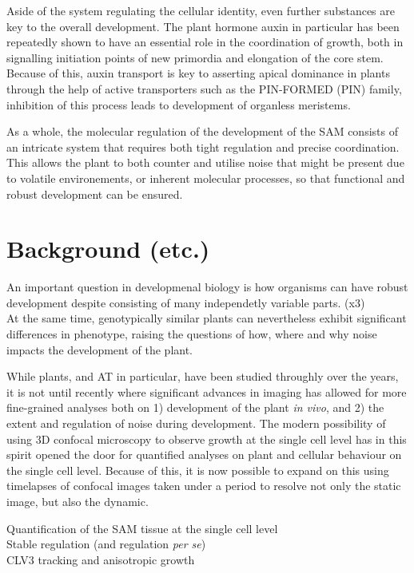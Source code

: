 Aside of the system regulating the cellular
identity, even further substances are key to the overall development.
The plant hormone auxin in particular has been repeatedly shown to have an
essential role in the coordination of growth, both in 
signalling initiation points of new primordia and elongation of the core stem.
Because of this, auxin transport is key to asserting apical dominance in plants
through the help of active transporters such as the PIN-FORMED (PIN) family,
inhibition of this process leads to development of organless meristems.
\CITE 

As a whole, the molecular regulation of the
development of the SAM consists of an intricate system that requires both tight
regulation and precise coordination. This allows the plant to both counter and 
utilise noise that might be present due to volatile environements, or inherent
molecular processes, so that functional and robust development can be ensured.

\section{Background (etc.)}
An important question in developmenal biology is how organisms can have robust
development despite consisting of many independetly variable parts. \CITE (x3) \\
At the same time, genotypically similar plants can nevertheless exhibit
significant differences in phenotype, raising the questions of how, where and
why noise impacts the development of the plant. 

While plants, and AT in particular, have been studied throughly over the years,
it is not until recently where significant advances in imaging has allowed for
more fine-grained analyses both on 1) development of the plant \textit{in vivo},
and 2) the extent and regulation of noise during development. The modern
possibility of using 3D confocal microscopy to observe growth at the
single cell level has in this spirit opened the door for quantified analyses on
plant and cellular behaviour on the single cell level. Because of this, it is now
possible to expand on this using timelapses of confocal images taken under a
period to resolve not only the static image, but also the dynamic. 

Quantification of the SAM tissue at the single cell level\\
Stable regulation (and regulation \textit{per se})\\
CLV3 tracking and anisotropic growth \\



